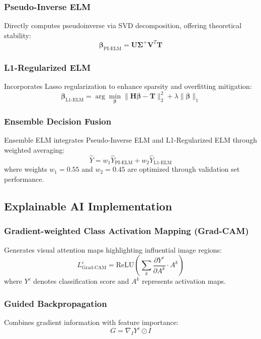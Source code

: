 \documentclass[11pt,a4paper]{article}
\begin{document}
\subsubsection{Pseudo-Inverse ELM}
Directly computes pseudoinverse via SVD decomposition, offering theoretical stability:
\begin{equation}
\boldsymbol{\beta}_{\text{PI-ELM}} = \mathbf{U} \mathbf{\Sigma}^{+} \mathbf{V}^T \mathbf{T}
\end{equation}

\subsubsection{L1-Regularized ELM}
Incorporates Lasso regularization to enhance sparsity and overfitting mitigation:
\begin{equation}
\boldsymbol{\beta}_{\text{L1-ELM}} = \arg\min_{\boldsymbol{\beta}} \|\mathbf{H} \boldsymbol{\beta} - \mathbf{T}\|_2^2 + \lambda \|\boldsymbol{\beta}\|_1
\end{equation}

\subsubsection{Ensemble Decision Fusion}
Ensemble ELM integrates Pseudo-Inverse ELM and L1-Regularized ELM through weighted averaging:
\begin{equation}
\hat{Y} = w_1 \hat{Y}_{\text{PI-ELM}} + w_2 \hat{Y}_{\text{L1-ELM}}
\end{equation}
where weights $w_1 = 0.55$ and $w_2 = 0.45$ are optimized through validation set performance.

\subsection{Explainable AI Implementation}

\subsubsection{Gradient-weighted Class Activation Mapping (Grad-CAM)}
Generates visual attention maps highlighting influential image regions:
\begin{equation}
L_{\text{Grad-CAM}}^c = \text{ReLU}\left(\sum_k \frac{\partial Y^c}{\partial A^k} \cdot A^k\right)
\end{equation}
where $Y^c$ denotes classification score and $A^k$ represents activation maps.

\subsubsection{Guided Backpropagation}
Combines gradient information with feature importance:
\begin{equation}
G = \nabla_{I} Y^c \odot I
\end{equation}
\end{document}
